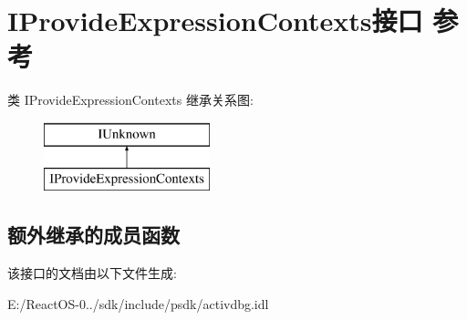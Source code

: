 \hypertarget{interface_i_provide_expression_contexts}{}\section{I\+Provide\+Expression\+Contexts接口 参考}
\label{interface_i_provide_expression_contexts}
类 I\+Provide\+Expression\+Contexts 继承关系图\+:\begin{figure}[H]
\begin{center}
\leavevmode
\includegraphics[height=2.000000cm]{interface_i_provide_expression_contexts}
\end{center}
\end{figure}
\subsection*{额外继承的成员函数}


该接口的文档由以下文件生成\+:\begin{DoxyCompactItemize}
\item 
E\+:/\+React\+O\+S-\/0../sdk/include/psdk/activdbg.\+idl\end{DoxyCompactItemize}
